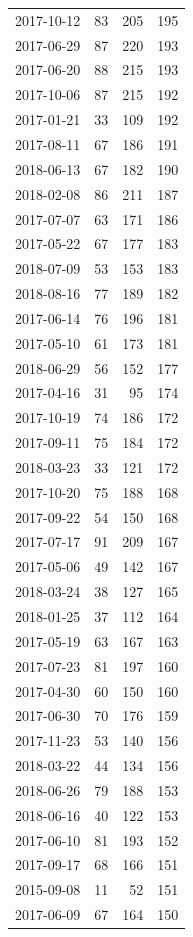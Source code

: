 \begin{tabular}{lrrr}
2017-10-12 & 83 & 205 & 195 \\
2017-06-29 & 87 & 220 & 193 \\
2017-06-20 & 88 & 215 & 193 \\
2017-10-06 & 87 & 215 & 192 \\
2017-01-21 & 33 & 109 & 192 \\
2017-08-11 & 67 & 186 & 191 \\
2018-06-13 & 67 & 182 & 190 \\
2018-02-08 & 86 & 211 & 187 \\
2017-07-07 & 63 & 171 & 186 \\
2017-05-22 & 67 & 177 & 183 \\
2018-07-09 & 53 & 153 & 183 \\
2018-08-16 & 77 & 189 & 182 \\
2017-06-14 & 76 & 196 & 181 \\
2017-05-10 & 61 & 173 & 181 \\
2018-06-29 & 56 & 152 & 177 \\
2017-04-16 & 31 & 95 & 174 \\
2017-10-19 & 74 & 186 & 172 \\
2017-09-11 & 75 & 184 & 172 \\
2018-03-23 & 33 & 121 & 172 \\
2017-10-20 & 75 & 188 & 168 \\
2017-09-22 & 54 & 150 & 168 \\
2017-07-17 & 91 & 209 & 167 \\
2017-05-06 & 49 & 142 & 167 \\
2018-03-24 & 38 & 127 & 165 \\
2018-01-25 & 37 & 112 & 164 \\
2017-05-19 & 63 & 167 & 163 \\
2017-07-23 & 81 & 197 & 160 \\
2017-04-30 & 60 & 150 & 160 \\
2017-06-30 & 70 & 176 & 159 \\
2017-11-23 & 53 & 140 & 156 \\
2018-03-22 & 44 & 134 & 156 \\
2018-06-26 & 79 & 188 & 153 \\
2018-06-16 & 40 & 122 & 153 \\
2017-06-10 & 81 & 193 & 152 \\
2017-09-17 & 68 & 166 & 151 \\
2015-09-08 & 11 & 52 & 151 \\
2017-06-09 & 67 & 164 & 150 \\

\end{tabular}
